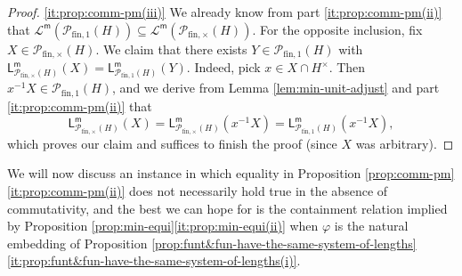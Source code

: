\documentclass{report}
\renewcommand{\P}{\mathcal{P}}
\newcommand{\fin}{\textrm{fin}}
\newcommand{\funt}{{\textrm{fin}, \times}}
\newcommand{\m}{{\mathsf{m}}}
\renewcommand{\:}{\text{:}}
\theoremstyle{definition}
\begin{document}
\begin{proof}
	\ref{it:prop:comm-pm(iii)} We already know from part \ref{it:prop:comm-pm(ii)} that $\mathscr L^\m(\mathcal P_{\fin,1}(H)) \subseteq \mathscr L^\m(\mathcal P_\funt(H))$. For the opposite inclusion, fix $X \in \P_\funt(H)$. We claim that there exists $Y \in \mathcal P_{\fin,1}(H)$ with 
	$\mathsf L_{\P_\funt(H)}^\m(X) = \mathsf L_{\P_{\fin,1}(H)}^\m(Y)$.
	Indeed, pick $x \in X \cap H^\times$. Then $x^{-1} X\in \P_{\fin,1}(H)$, and we derive from Lemma \ref{lem:min-unit-adjust} and part \ref{it:prop:comm-pm(ii)} that 
	\[
	\mathsf{L}_{\P_\funt(H)}^\m(X) = \mathsf{L}_{\P_\funt(H)}^\m(x^{-1}X) = \mathsf{L}_{\P_{\fin,1}(H)}^\m(x^{-1} X),
	\]
	which proves our claim and suffices to finish the proof (since $X$ was arbitrary).
\end{proof}
%
We will now discuss an instance in which equality in Proposition \ref{prop:comm-pm}\ref{it:prop:comm-pm(ii)} does not necessarily hold true in the absence of commutativity, and the best we can hope for is the containment relation implied by Proposition \ref{prop:min-equi}\ref{it:prop:min-equi(ii)} when $\varphi$ is the natural embedding of  Proposition \ref{prop:funt&fun-have-the-same-system-of-lengths}\ref{it:prop:funt&fun-have-the-same-system-of-lengths(i)}.
%
\end{document}
